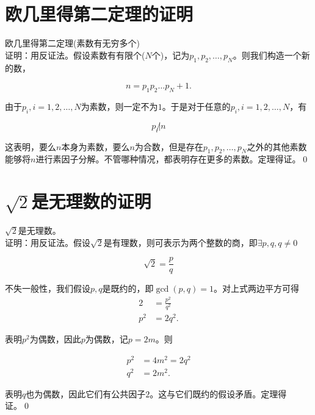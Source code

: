 \appendix


\chapter{欧几里得第二定理的证明}
\label{appendix:apps}

	\begin{theorem}
		欧几里得第二定理(素数有无穷多个)\\
		证明：用反证法。假设素数有有限个($N$个)，记为$p_1,p_2,\dots,p_N$。则我们构造一个新的数，
		
		\[n=p_1p_2\dots p_N+1.\]
		
		由于$p_i,i=1,2,\dots,N$为素数，则一定不为$1$。于是对于任意的$p_i,i=1,2,\dots, N$，有
		
		\[p_i\not|n\]
		
		这表明，要么$n$本身为素数，要么$n$为合数，但是存在$p_1,p_2,\dots,p_N$之外的其他素数能够将$n$进行素因子分解。不管哪种情况，都表明存在更多的素数。定理得证。\qed
	\end{theorem}

\chapter{$\sqrt{2}$是无理数的证明}
	\begin{theorem}
		$\sqrt{2}$是无理数。\\
		证明：用反证法。假设$\sqrt{2}$是有理数，则可表示为两个整数的商，即$\exists p,q, q\ne0$
		
		\[\sqrt{2}=\frac{p}{q}\]
		
		不失一般性，我们假设$p,q$是既约的，即$\gcd(p,q)=1$。对上式两边平方可得\\
		
		\begin{align*}
			2& =\frac{p^2}{q^2}\\
			p^2&=2q^2.
		\end{align*}
		
		表明$p^2$为偶数，因此$p$为偶数，记$p=2m$。则
		
		\begin{align*}
			p^2&=4m^2=2q^2\\
			q^2&=2m^2.
		\end{align*}
		
		表明$q$也为偶数，因此它们有公共因子$2$。这与它们既约的假设矛盾。定理得证。\qed
	\end{theorem} 